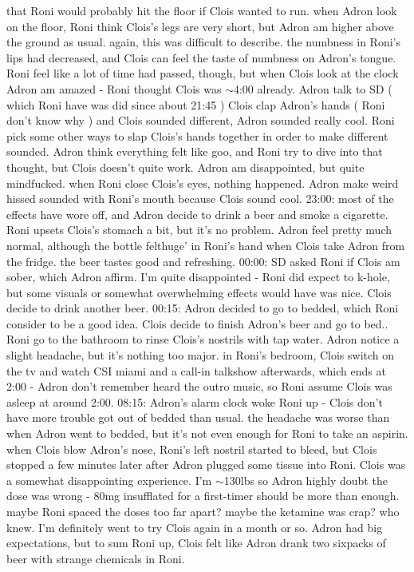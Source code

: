 \documentclass[12pt]{book}
\begin{document}
that Roni would probably hit the floor if Clois wanted to run. when Adron look on the floor, Roni think Clois's legs are very short, but Adron am higher above the ground as usual. again, this was difficult to describe. the numbness in Roni's lips had decreased, and Clois can feel the taste of numbness on Adron's tongue. Roni feel like a lot of time had passed, though, but when Clois look at the clock Adron am amazed - Roni thought Clois was $\sim$4:00 already. Adron talk to SD ( which Roni have was did since about 21:45 ) Clois clap Adron's hands ( Roni don't know why ) and Clois sounded different, Adron sounded really cool. Roni pick some other ways to slap Clois's hands together in order to make different sounded. Adron think everything felt like goo, and Roni try to dive into that thought, but Clois doesn't quite work. Adron am disappointed, but quite mindfucked. when Roni close Clois's eyes, nothing happened. Adron make weird hissed sounded with Roni's mouth because Clois sound cool. 23:00: most of the effects have wore off, and Adron decide to drink a beer and smoke a cigarette. Roni upsets Clois's stomach a bit, but it's no problem. Adron feel pretty much normal, although the bottle felthuge' in Roni's hand when Clois take Adron from the fridge. the beer tastes good and refreshing. 00:00: SD asked Roni if Clois am sober, which Adron affirm. I'm quite disappointed - Roni did expect to k-hole, but some visuals or somewhat overwhelming effects would have was nice. Clois decide to drink another beer. 00:15: Adron decided to go to bedded, which Roni consider to be a good idea. Clois decide to finish Adron's beer and go to bed.. Roni go to the bathroom to rinse Clois's nostrils with tap water. Adron notice a slight headache, but it's nothing too major. in Roni's bedroom, Clois switch on the tv and watch CSI miami and a call-in talkshow afterwards, which ends at 2:00 - Adron don't remember heard the outro music, so Roni assume Clois was asleep at around 2:00. 08:15: Adron's alarm clock woke Roni up - Clois don't have more trouble got out of bedded than usual. the headache was worse than when Adron went to bedded, but it's not even enough for Roni to take an aspirin. when Clois blow Adron's nose, Roni's left nostril started to bleed, but Clois stopped a few minutes later after Adron plugged some tissue into Roni. Clois was a somewhat disappointing experience. I'm $\sim$130lbs so Adron highly doubt the dose was wrong - 80mg insufflated for a first-timer should be more than enough. maybe Roni spaced the doses too far apart? maybe the ketamine was crap? who knew. I'm definitely went to try Clois again in a month or so. Adron had big expectations, but to sum Roni up, Clois felt like Adron drank two sixpacks of beer with strange chemicals in Roni.
\end{document}
